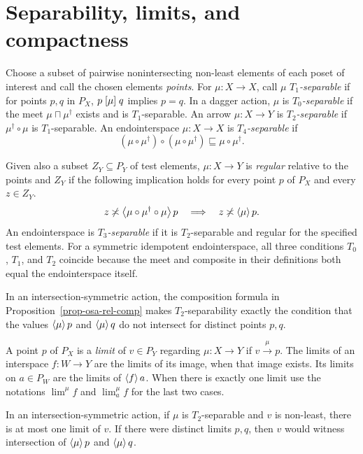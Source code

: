 \section{Separability, limits, and compactness}
\label{sec-osa-separation}

\begin{defn}\label{def-osa-separation}
Choose a subset of pairwise nonintersecting non-least elements of each
poset of interest and call the chosen elements \emph{points}. For
$\mu:X\to X$, call $\mu$ \emph{$T_1$-separable} if for points $p,q$
in $P_X$, $p\mathrel{\left[\mu\right]}q$ implies $p=q$. In a dagger action,
$\mu$ is \emph{$T_0$-separable} if the meet
$\mu\sqcap\mu^\dagger$ exists and is $T_1$-separable. An arrow
$\mu:X\to Y$ is \emph{$T_2$-separable} if $\mu^\dagger\circ\mu$
is $T_1$-separable. An endointerspace $\mu:X\to X$ is
\emph{$T_4$-separable} if
\[
 (\mu\circ\mu^\dagger)\circ(\mu\circ\mu^\dagger)
 \sqsubseteq \mu\circ\mu^\dagger.
\]

Given also a subset $Z_Y\subseteq P_Y$ of test elements,
$\mu:X\to Y$ is \emph{regular} relative to the points and $Z_Y$ if
the following implication holds for every point $p$ of $P_X$
and every $z\in Z_Y$.
\[
 z\not\asymp\left\langle \mu\circ\mu^\dagger\circ\mu\right\rangle p
 \quad\Longrightarrow\quad z\not\asymp\left\langle \mu\right\rangle p.
\]
An endointerspace is \emph{$T_3$-separable} if it is $T_2$-separable
and regular for the specified test elements.
For a symmetric idempotent endointerspace, all three conditions
$T_0$, $T_1$, and $T_2$ coincide because the meet and composite
in their definitions both equal the endointerspace itself.
\end{defn}

In an intersection-symmetric action, the composition formula in
Proposition~\ref{prop-osa-rel-comp} makes $T_2$-separability exactly
the condition that the values $\left\langle \mu\right\rangle p$ and $\left\langle \mu\right\rangle q$
do not intersect for distinct points $p,q$.

\begin{defn}\label{def-osa-limit}
A point $p$ of $P_X$ is a \emph{limit} of $v\in P_Y$ regarding
$\mu:X\to Y$ if $v\overset{\mu}{\longrightarrow}p$. The limits
of an interspace $f:W\to Y$ are the limits of its image,
when that image exists. Its limits on $a\in P_W$ are the limits
of $\left\langle f\right\rangle a$. When there is exactly one limit use the
notations $\lim^\mu f$ and $\lim_a^\mu f$ for the last two cases.
\end{defn}

In an intersection-symmetric action, if $\mu$ is $T_2$-separable
and $v$ is non-least, there is at most one limit of $v$. If there
were distinct limits $p,q$, then $v$ would witness intersection of
$\left\langle \mu\right\rangle p$ and $\left\langle \mu\right\rangle q$.

